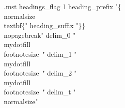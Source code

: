 \AtBeginDocument{%
\renewcommand{\chapterautorefname}{Chap.}
\renewcommand{\sectionautorefname}{Sect.}
\renewcommand{\subsectionautorefname}{Sect.}
\renewcommand{\subsubsectionautorefname}{Sect.}
\renewcommand{\figureautorefname}{Fig.}
\newcommand{\definitionautorefname}{Def.}
\newcommand{\algorithmautorefname}{Algo.}
\newcommand{\notationautorefname}{Notation}}

\algrenewcommand{}

\DeclareRobustCommand\mydotfill{%
\leavevmode
\cleaders \hbox to.44em{\hss.\hss}\hskip 1.32em plus 1fill
\kern0pt }

\makeatletter
\renewenvironment{theindex}
{{\chapter{\indexname}\label{sec:app:index}}\par%
\@mkboth{\MakeUppercase\indexname}{\MakeUppercase\indexname}%
\parindent\z@
\parskip\z@ \@plus .5\p@\relax
\let\item\@idxitem
\setlength{\columnsep}{20pt}
\setlength{\parindent}{0em}
\begin{multicols*}{2}\raggedcolumns}
{\end{multicols*}}
\renewcommand{\@idxitem}{\par\hangindent 21\p@}
\makeatother

\begin{filecontents}{\jobname.mst}
headings_flag 1
heading_prefix "\{\\normalsize\\textbf\{"
heading_suffix "\}\}\\nopagebreak\n"
delim_0 " \\mydotfill \\footnotesize~"
delim_1 " \\mydotfill \\footnotesize~"
delim_2 " \\mydotfill \\footnotesize~"
delim_t "\\normalsize"
\end{filecontents}

\renewcommand{\glsdescwidth}{11cm}

\captionsetup{justification=double}
\renewcommand{\footnotelayout}{\doublespacing}
\setlength{\footnotesep}{\baselineskip}